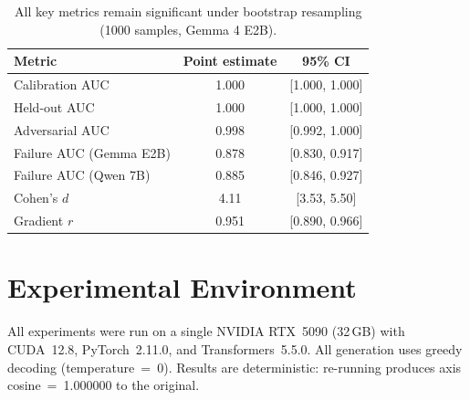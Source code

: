 \documentclass[11pt]{article}
\begin{document}
\begin{table}[h]
\caption{All key metrics remain significant under bootstrap resampling (1000 samples, Gemma 4 E2B).}
\vspace{4pt}
\centering
\small
\begin{tabular}{@{}lcc@{}}
\toprule
Metric & Point estimate & 95\% CI \\
\midrule
Calibration AUC & 1.000 & [1.000, 1.000] \\
Held-out AUC & 1.000 & [1.000, 1.000] \\
Adversarial AUC & 0.998 & [0.992, 1.000] \\
Failure AUC (Gemma E2B) & 0.878 & [0.830, 0.917] \\
Failure AUC (Qwen 7B) & 0.885 & [0.846, 0.927] \\
Cohen's $d$ & 4.11 & [3.53, 5.50] \\
Gradient $r$ & 0.951 & [0.890, 0.966] \\
\bottomrule
\end{tabular}
\end{table}

\section{Experimental Environment}\label{app:env}

All experiments were run on a single NVIDIA RTX~5090 (32\,GB) with CUDA~12.8, PyTorch~2.11.0, and Transformers~5.5.0. All generation uses greedy decoding (temperature~=~0). Results are deterministic: re-running produces axis cosine~=~1.000000 to the original.
\end{document}
